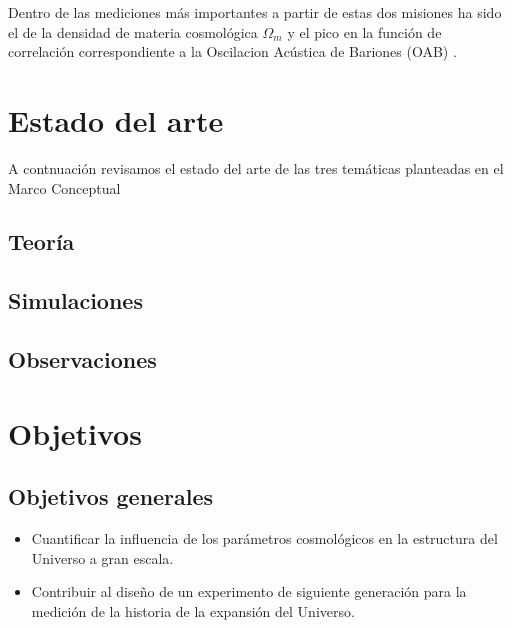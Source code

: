\documentclass[12pt]{article}
\begin{document}
Dentro de las mediciones m\'as importantes a partir de estas dos misiones
ha sido el de la densidad de materia cosmol\'ogica $\Omega_m$
\cite{2001Natur.410..169P} y el pico en la funci\'on de
correlaci\'on correspondiente a la Oscilacion Ac\'ustica de Bariones
(OAB) \cite{Eisenstein2005}.  







 


\section{Estado del arte}

A contnuaci\'on revisamos el estado del arte de las tres tem\'aticas
planteadas en el Marco Conceptual


\subsection{Teor\'ia}

\subsection{Simulaciones}

\subsection{Observaciones}

\section{Objetivos}

\subsection*{Objetivos generales} 

\begin{itemize}
\item  Cuantificar la influencia de los par\'ametros cosmol\'ogicos en la
  estructura del Universo a gran escala.
\item Contribuir al dise\~no de un experimento de siguiente
  generaci\'on para la medici\'on de la historia de la expansi\'on del
  Universo. 
\end{itemize}
\end{document}
